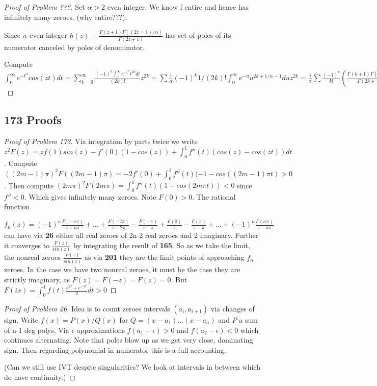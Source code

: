 \documentclass[10pt]{article}
\newcommand{\1}{\textbf{1}}
\theoremstyle{remark}
\theoremstyle{definition}
\begin{document}
\begin{proof}[Proof of Problem ???]
	Set $\alpha > 2$ even integer. We know f entire and hence has infinitely many zeroes. (why entire???). 

	Since $\alpha$ even integer $h(z) = \frac{\Gamma(z+1)\Gamma((2z=1)/\alpha)}{\Gamma(2z+1)}$ has set of poles of its numerator canceled by poles of denominator. 

	Compute $\int_0^{\infty} e^{-t^{\alpha}}cos(zt)dt = \sum_{k=0}^{\infty} \frac{(-1)^k\int_0^{\infty}e^{-t^{\alpha}}t^{2k}dt}{(2k)!}z^{2k} = \sum \frac{1}{\alpha} (-1)^k 1/(2k)! \int_0^{\infty} e^{-u}u^{2k+1/\alpha - 1} du z^{2k}= \frac{1}{\alpha}\sum \frac{(-1)^k}{k!}(\frac{\Gamma(k+1)\Gamma(\frac{2k+1}{\alpha})}{\Gamma(2k+1)})z^{2k}$
\end{proof}

\subsection{173 Proofs}

\begin{proof}[Proof of Problem 173]
	Via integration by parts twice we write $z^2 F(z) = zf(1)sin(z) - f'(0)(1-cos(z)) + \int_0^1 f''(t)(cos(z)-cos(zt))dt$. Compute $((2m-1)\pi)^2F((2m-1)\pi) = -2f'(0)+\int_0^1f''(t)(-1-cos((2m-1)\pi t) > 0$. Then compute $(2m \pi)^2F(2m\pi) = \int_0^1f''(t)(1-cos(2m\pi t)) < 0$ since $f'' < 0$. Which gives infinitely many zeroes. Note $F(0)>0$. The rational function

	$f_n(z) = (-1)^n\frac{F(-n\pi)}{z+n\pi} + ... + \frac{F(-2\pi)}{z+2\pi}-\frac{F(-\pi)}{z+\pi}+\frac{F(0)}{z}-\frac{F(\pi)}{z-\pi}+...+(-1)^n\frac{F(n\pi)}{z-n\pi}$ can have via \textbf{26} either all real zeroes of 2n-2 real zeroes and 2 imaginary. Further it converges to $\frac{F(z)}{sin(z)}$ by integrating the result of \textbf{165}. So as we take the limit, the nonreal zeroes $\frac{F(z)}{sin(z)}$ as via \textbf{201} they are the limit points of approaching $f_n$ zeroes. In the case we have two nonreal zeroes, it must be the case they are strictly imaginary, as $F(z) = F(-z) =F(\overline{z})= 0$. But $F(ix) = \int_0^1 f(t)\frac{e^{xt}+e^{-xt}}{2}dt > 0$
\end{proof}

\begin{proof}[Proof of Problem 26]
	Idea is to count zeroes intervals $(a_i,a_{i+1})$ via changes of sign. Write $f(x) = P(x)/Q(x)$ for $Q = (x-a_1)...(x-a_n)$ and $P$ a sum of n-1 deg polys. Via $\epsilon$ approximations $f(a_1+\epsilon) > 0$ and $f(a_2 -\epsilon) <0$ which continues alternating. Note that poles blow up as we get very close, dominating sign. Then regarding polynomial in numerator this is a full accounting.

	(Can we still use IVT despite singularities? We look at intervals in between which do have continuity.) 
\end{proof}
\end{document}

